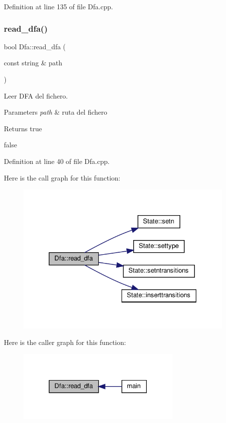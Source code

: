 Definition at line 135 of file Dfa.\+cpp.

\mbox{\label{class_dfa_a54b373da1b88485641d0aa0e5fa303dd}} 
\subsubsection{\texorpdfstring{read\+\_\+dfa()}{read\_dfa()}}
{\footnotesize\ttfamily bool Dfa\+::read\+\_\+dfa (\begin{DoxyParamCaption}\item[{const string \&}]{path }\end{DoxyParamCaption})}



Leer D\+FA del fichero. 


\begin{DoxyParams}{Parameters}
{\em path} & ruta del fichero \\
\hline
\end{DoxyParams}
\begin{DoxyReturn}{Returns}
true 

false 
\end{DoxyReturn}


Definition at line 40 of file Dfa.\+cpp.

Here is the call graph for this function\+:
\nopagebreak
\begin{figure}[H]
\begin{center}
\leavevmode
\includegraphics[width=307pt]{class_dfa_a54b373da1b88485641d0aa0e5fa303dd_cgraph}
\end{center}
\end{figure}
Here is the caller graph for this function\+:
\nopagebreak
\begin{figure}[H]
\begin{center}
\leavevmode
\includegraphics[width=230pt]{class_dfa_a54b373da1b88485641d0aa0e5fa303dd_icgraph}
\end{center}
\end{figure}


